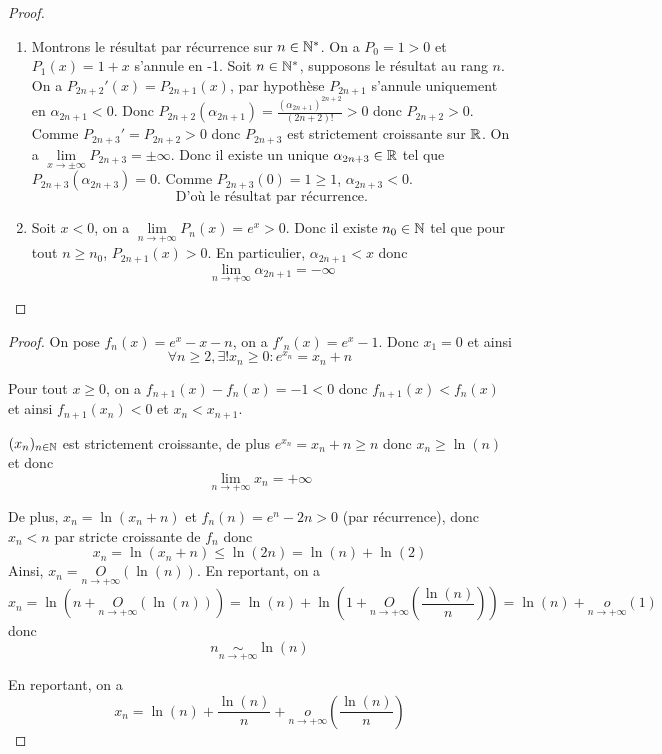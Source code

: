 \begin{proof}
	\phantom{}
	\begin{enumerate}
		\item Montrons le résultat par récurrence sur $n\in\mathbb{N}^{*}$. On a $P_{0}=1>0$ et $P_{1}(x)=1+x$ s'annule en -1. Soit $n\in\mathbb{N}^{*}$, supposons le résultat au rang $n$. On a $P_{2n+2}'(x)=P_{2n+1}(x)$, par hypothèse $P_{2n+1}$ s'annule uniquement en $\alpha_{2n+1}<0$. Donc $P_{2n+2}	(\alpha_{2n+1})=\frac{\left(\alpha_{2n+1}\right)^{2n+2}}{(2n+2)!}>0$ donc $P_{2n+2}>0$.
		Comme $P_{2n+3}'=P_{2n+2}>0$ donc $P_{2n+3}$ est strictement croissante sur $\mathbb{R}$. On a $\lim\limits_{x\to\pm\infty}P_{2n+3}=\pm\infty$. Donc il existe un unique $\alpha_{2n+3}\in\mathbb{R}$ tel que $P_{2n+3}(\alpha_{2n+3})=0$. Comme $P_{2n+3}(0)=1\geqslant1$, $\alpha_{2n+3}<0$.
		$$\boxed{\text{D'où le résultat par récurrence.}}$$

		\item Soit $x<0$, on a $\lim\limits_{n\to+\infty}P_{n}(x)=e^{x}>0$. Donc il existe $n_{0}\in\mathbb{N}$ tel que pour tout $n\geqslant n_{0}$, $P_{2n+1}(x)>0$. En particulier, $\alpha_{2n+1}<x$ donc 
		$$\boxed{\lim\limits_{n\to+\infty}\alpha_{2n+1}=-\infty}$$
	\end{enumerate}
\end{proof}

\begin{proof}
	On pose $f_{n}(x)=e^{x}-x-n$, on a $f'_{n}(x)=e^{x}-1$. Donc $x_{1}=0$ et ainsi 
	$$\boxed{\forall n\geqslant 2,\exists! x_n\geqslant0\colon e^{x_{n}}=x_{n}+n}$$

	Pour tout $x\geqslant0$, on a $f_{n+1}(x)-f_{n}(x)=-1<0$ donc $f_{n+1}(x)<f_{n}(x)$ et ainsi $f_{n+1}(x_{n})<0$ et $x_{n}<x_{n+1}$.

	$(x_{n})_{n\in\mathbb{N}}$ est strictement croissante, de plus $e^{x_{n}}=x_{n}+n\geqslant n$ donc $x_{n}\geqslant \ln(n)$ et donc 
	$$\boxed{\lim\limits_{n\to+\infty}x_{n}=+\infty}$$

	De plus, $x_{n}=\ln(x_{n}+n)$ et $f_{n}(n)=e^{n}-2n>0$ (par récurrence), donc $x_{n}<n$ par stricte croissante de $f_{n}$ donc 
	$$x_{n}=\ln(x_{n}+n)\leqslant \ln(2n)=\ln(n)+\ln(2)$$
	Ainsi, $x_{n}=\underset{n\to+\infty}{O}(\ln(n))$. En reportant, on a 
	$$x_{n}=\ln(n+\underset{n\to+\infty}{O}(\ln(n)))=\ln(n)+\ln(1+\underset{n\to+\infty}{O}\left(\frac{\ln(n)}{n}\right))=\ln(n)+\underset{n\to+\infty}{o}(1)$$
	donc 
	$$\boxed{n\underset{n\to+\infty}{\sim}\ln(n)}$$

	En reportant, on a 
	$$\boxed{x_{n}=\ln(n)+\frac{\ln(n)}{n}+\underset{n\to+\infty}{o}\left(\frac{\ln(n)}{n}\right)}$$
\end{proof}

